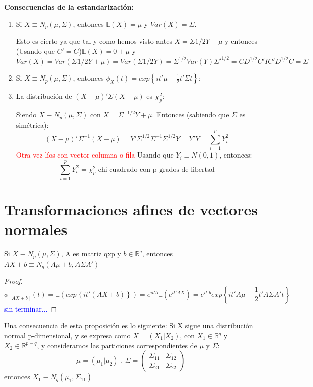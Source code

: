 \documentclass[palatino,nochap]{apuntes}
\begin{document}
\textbf{Consecuencias de la estandarización:}
\begin{enumerate}
\item Si $X\equiv N_p(\mu, \Sigma)$, entonces $\mathbb{E}(X)=\mu$ y $Var(X)=\Sigma$.

Esto es cierto ya que tal y como hemos visto antes $X=\Sigma{1/2}Y+\mu$ y entonces  (Usando que $C'=C$)$\mathbb{E}(X)=0+\mu$ y $Var(X)=Var(\Sigma{1/2}Y+\mu)=Var(\Sigma{1/2}Y)=\Sigma^{1/2}Var(Y)\Sigma'^{1/2}=CD^{1/2}C'IC'D^{1/2}C=\Sigma$

\item Si $X\equiv N_p(\mu, \Sigma)$, entonces $\phi_X(t)=exp\left\{ it'\mu-\frac{1}{2}t'\Sigma t \right\}$:
\item La distribución de $(X-\mu)'\Sigma(X-\mu)$ es $\chi^2_p$:

Siendo $X\equiv N_p(\mu,\Sigma)$ con $X=\Sigma^{-1/2}Y+\mu$. Entonces (sabiendo que $\Sigma$ es simétrica):
\[
(X-\mu)'\Sigma^{-1}(X-\mu)=Y'\Sigma^{1/2}\Sigma^{-1}\Sigma^{1/2}Y=Y'Y=\sum_{i=1}^{p} Y_i^2
\]
\textcolor{red}{Otra vez líos con vector columna o fila}
Usando que $Y_i\equiv N(0,1)$, entonces:
\[
\sum_{i=1}^{p} Y_i^2 = \chi^2_p \text{ chi-cuadrado con p grados de libertad}
\]

\end{enumerate}

\section{Transformaciones afines de vectores normales}
\begin{prop}
Si $X \equiv N_p(\mu, \Sigma)$, A es matriz qxp y $b\in \mathbb{R}^q$, entonces $AX+b \equiv N_q(A\mu +b, A\Sigma A')$
\end{prop}
\begin{proof}
\[
\phi_[AX+b](t)=\mathbb{E}\left( exp\left\{ it'(AX+b) \right\} \right) = e^{it'b}\mathbb{E}\left( e^{it'AX} \right) = e^{it'b} exp\left\{ it'A\mu-\frac{1}{2}t'A\Sigma A't \right\}
\]
\textcolor{blue}{sin terminar...}
\end{proof}

Una consecuencia de esta proposición es lo siguiente: Si X sigue una distribución normal p-dimensional, y se expresa como $X=(X_1|X_2)$, con $X_1\in \mathbb{R}^q$ y $X_2\in \mathbb{R}^{p-q}$, y consideramos las particiones correspondientes de $\mu$ y $\Sigma$:
\[
\mu=(\mu_1 | \mu_2) \text{ , } \Sigma=
\left(
\begin{array}{c|c}
\Sigma_{11}& \Sigma_{12} \\
\hline
\Sigma_{21}& \Sigma_{22} 
\end{array}
\right)
\]
entonces $X_1\equiv N_q(\mu_1, \Sigma_{11})$
\end{document}

